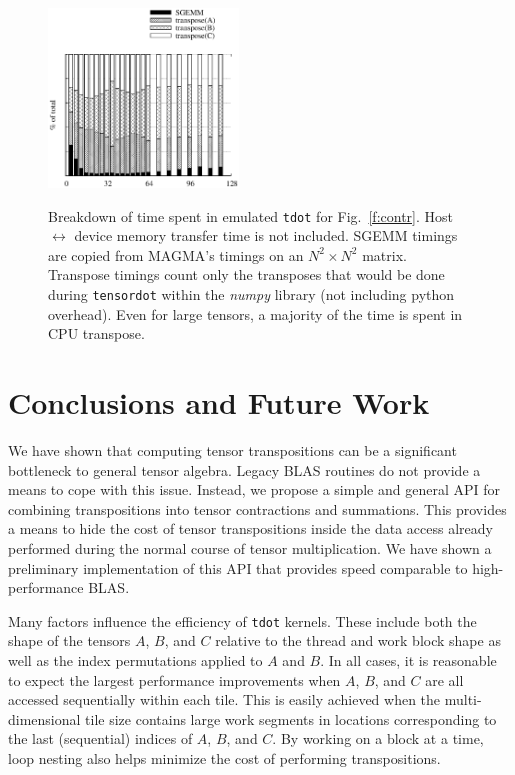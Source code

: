 \documentclass[preprint]{sigplanconf}
\begin{document}
\begin{figure}
{ \centering
\includegraphics[width=0.45\textwidth]{pct.eps} }
\caption{Breakdown of time spent in emulated {\tt tdot} for Fig.~\ref{f:contr}.
Host $\leftrightarrow$ device memory transfer time is not included.
SGEMM timings are copied from MAGMA's timings on an $N^2 \times N^2$ matrix.
Transpose timings count only the transposes that would be done during {\tt tensordot}
within the {\em numpy} library (not including python overhead).
Even for large tensors, a majority of the time is spent in CPU transpose.}\label{f:pct}
\end{figure}
  
\section{ Conclusions and Future Work}

  We have shown that computing tensor transpositions can be a significant
bottleneck to general tensor algebra.  Legacy BLAS routines do not provide
a means to cope with this issue.  Instead, we propose a simple and
general API for combining transpositions into tensor contractions and summations.
This provides a means to hide the cost of tensor transpositions
inside the data access already performed during the normal course of tensor multiplication.
We have shown a preliminary implementation of this API that provides
speed comparable to high-performance BLAS.

  Many factors influence the efficiency of {\tt tdot} kernels.  These include
both the shape of the tensors $A$, $B$, and $C$ relative to the thread
and work block shape as well as the index permutations applied to $A$ and $B$.
In all cases, it is reasonable to expect the largest performance improvements
when $A$, $B$, and $C$ are all accessed sequentially within each tile.
This is easily achieved when the multi-dimensional tile size contains large work segments
in locations corresponding to the last (sequential) indices of $A$, $B$, and $C$.
By working on a block at a time, loop nesting also helps minimize the cost of performing
transpositions.
\end{document}
